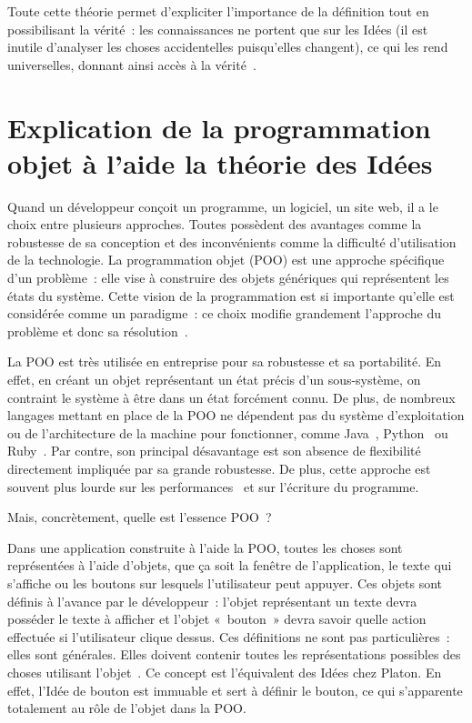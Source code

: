 \documentclass[a4paper, titlepage, 12pt]{article}
\begin{document}
	Toute cette théorie permet d'expliciter l'importance de la définition tout en possibilisant la vérité~: les connaissances ne portent que sur les Idées (il est inutile d'analyser les choses accidentelles puisqu'elles changent), ce qui les rend universelles, donnant ainsi accès à la vérité~\cite{platonTheetete2016}.

	\newpage
	\section{Explication de la programmation objet à l'aide la théorie des Idées}

	Quand un développeur conçoit un programme, un logiciel, un site web, il a le choix entre plusieurs approches. Toutes possèdent des avantages comme la robustesse de sa conception et des inconvénients comme la difficulté d'utilisation de la technologie. La programmation objet (POO) est une approche spécifique d'un problème~: elle vise à construire des objets génériques qui représentent les états du système. Cette vision de la programmation est si importante qu'elle est considérée comme un paradigme~: ce choix modifie grandement l'approche du problème et donc sa résolution~\cite{ParadigmeProgrammation2025}.

	La POO est très utilisée en entreprise pour sa robustesse et sa portabilité. En effet, en créant un objet représentant un état précis d'un sous-système, on contraint le système à être dans un état forcément connu. De plus, de nombreux langages mettant en place de la POO ne dépendent pas du système d'exploitation ou de l'architecture de la machine pour fonctionner, comme Java~\cite{JavaTechnique2024}, Python~\cite{PythonLangage2025} ou Ruby~\cite{Ruby2025}. Par contre, son principal désavantage est son absence de flexibilité directement impliquée par sa grande robustesse. De plus, cette approche est souvent plus lourde sur les performances~\cite{pereiraEnergyEfficiencyProgramming2017} et sur l'écriture du programme.

	Mais, concrètement, quelle est l'essence POO~?

	Dans une application construite à l'aide la POO, toutes les choses sont représentées à l'aide d'objets, que ça soit la fenêtre de l'application, le texte qui s'affiche ou les boutons sur lesquels l'utilisateur peut appuyer. Ces objets sont définis à l'avance par le développeur~: l'objet représentant un texte devra posséder le texte à afficher et l'objet «~bouton~» devra savoir quelle action effectuée si l'utilisateur clique dessus. Ces définitions ne sont pas particulières~: elles sont générales. Elles doivent contenir toutes les représentations possibles des choses utilisant l'objet~\cite{ProgrammationOrienteeObjet2025}. Ce concept est l'équivalent des Idées chez Platon. En effet, l'Idée de bouton est immuable et sert à définir le bouton, ce qui s'apparente totalement au rôle de l'objet dans la POO. 
\end{document}
